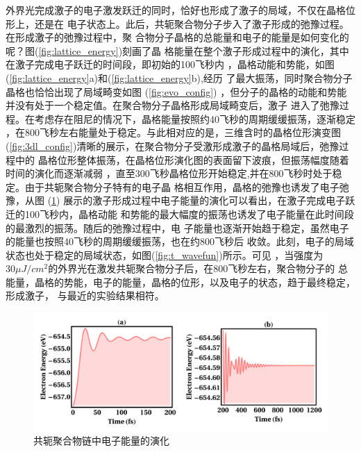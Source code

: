\documentclass[12pt,]{report}
\begin{document}
外界光完成激子的电子激发跃迁的同时，恰好也形成了激子的局域，不仅在晶格位形上，还是在
电子状态上。此后，共轭聚合物分子步入了激子形成的弛豫过程。在形成激子的弛豫过程中，聚
合物分子晶格的总能量和电子的能量是如何变化的呢？图(\ref{fig:lattice_energy})刻画了晶
格能量在整个激子形成过程中的演化，其中在激子完成电子跃迁的时间段，即初始的100飞秒内
，晶格动能和势能，如图(\ref{fig:lattice_energy}a)和(\ref{fig:lattice_energy}b),经历
了最大振荡，同时聚合物分子晶格也恰恰出现了局域畸变如图
(\ref{fig:evo_config})
，但分子的晶格的动能和势能并没有处于一个稳定值。在聚合物分子晶格形成局域畸变后，激子
进入了弛豫过程。在考虑存在阻尼的情况下，晶格能量按照约40飞秒的周期缓缓振荡，逐渐稳定
，在800飞秒左右能量处于稳定。与此相对应的是，三维含时的晶格位形演变图
(\ref{fig:3dl_config})清晰的展示，在聚合物分子受激形成激子的晶格局域后，弛豫过程中的
晶格位形整体振荡，在晶格位形演化图的表面留下波痕，但振荡幅度随着时间的演化而逐渐减弱
，直至300飞秒晶格位形开始稳定,并在800飞秒时处于稳定。由于共轭聚合物分子特有的电子晶
格相互作用，晶格的弛豫也诱发了电子弛豫，从图 (\ref{fig:electron_energy})
展示的激子形成过程中电子能量的演化可以看出，在激子完成电子跃迁的100飞秒内，晶格动能
和势能的最大幅度的振荡也诱发了电子能量在此时间段的最激烈的振荡。随后的弛豫过程中，电
子能量也逐渐开始趋于稳定，虽然电子的能量也按照40飞秒的周期缓缓振荡，也在约800飞秒后
收敛。此刻，电子的局域状态也处于稳定的局域状态，如图(\ref{fig:t_wavefun})所示。可见
，当强度为\(30\mu J/cm^2\)的外界光在激发共轭聚合物分子后，在800飞秒左右，聚合物分子的
总能量，晶格的势能，电子的能量，晶格的位形，以及电子的状态，趋于最终稳定，形成激子，
与最近的实验结果相符。

\begin{figure}[h!] 
    \centering
    \includegraphics[scale=1]{./figures/Exciton_Figure_9.png}
    \caption{共轭聚合物链中电子能量的演化}
    \label{fig:electron_energy}
\end{figure}
\end{document}
